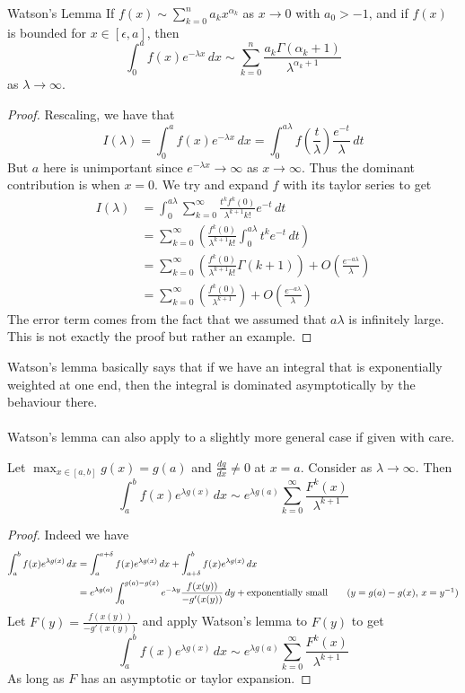 \documentclass[a4paper]{article}
\begin{document}
\begin{lmm}{Watson's Lemma}{} If $f(x)\sim\sum_{k=0}^na_kx^{\alpha_k}$ as $x\to 0$ with $a_0>-1$, and if $f(x)$ is bounded for $x\in[\epsilon,a]$, then $$\int_0^af(x)e^{-\lambda x}\,dx\sim\sum_{k=0}^n\frac{a_k\Gamma(\alpha_k+1)}{\lambda^{\alpha_k+1}}$$ as $\lambda\to\infty$. \tcbline
\begin{proof}
Rescaling, we have that $$I(\lambda)=\int_0^af(x)e^{-\lambda x}\,dx=\int_0^{a\lambda}f\left(\frac{t}{\lambda}\right)\frac{e^{-t}}{\lambda}\,dt$$ But $a$ here is unimportant since $e^{-\lambda x}\to\infty$ as $x\to\infty$. Thus the dominant contribution is when $x=0$. We try and expand $f$ with its taylor series to get 
\begin{align*}
I(\lambda)&=\int_0^{a\lambda}\sum_{k=0}^\infty\frac{t^kf^k(0)}{\lambda^{k+1}k!}e^{-t}\,dt\\
&=\sum_{k=0}^\infty\left(\frac{f^k(0)}{\lambda^{k+1}k!}\int_0^{a\lambda}t^ke^{-t}\,dt\right)\\
&=\sum_{k=0}^\infty\left(\frac{f^k(0)}{\lambda^{k+1}k!}\Gamma(k+1)\right)+O\left(\frac{e^{-a\lambda}}{\lambda}\right)\\
&=\sum_{k=0}^\infty\left(\frac{f^k(0)}{\lambda^{k+1}}\right)+O\left(\frac{e^{-a\lambda}}{\lambda}\right)
\end{align*}
The error term comes from the fact that we assumed that $a\lambda$ is infinitely large. This is not exactly the proof but rather an example. 
\end{proof}
\end{lmm}

Watson's lemma basically says that if we have an integral that is exponentially weighted at one end, then the integral is dominated asymptotically by the behaviour there. \\~\\
Watson's lemma can also apply to a slightly more general case if given with care. 
\begin{crl}{}{} Let $\max_{x\in[a,b]}g(x)=g(a)$ and $\frac{dg}{dx}\neq 0$ at $x=a$. Consider as $\lambda\to\infty$. Then $$\int_a^bf(x)e^{\lambda g(x)}\,dx\sim e^{\lambda g(a)}\sum_{k=0}^\infty\frac{F^k(x)}{\lambda^{k+1}}$$ \tcbline
\begin{proof}
Indeed we have 
\begin{align*}
\int_a^bf(x)e^{\lambda g(x)}\,dx&=\int_a^{a+\delta}f(x)e^{\lambda g(x)}\,dx+\int_{a+\delta}^bf(x)e^{\lambda g(x)}\,dx\\
&=e^{\lambda g(a)}\int_0^{g(a)-g(x)}e^{-\lambda y}\frac{f(x(y))}{-g'(x(y))}\,dy+\text{exponentially small}\tag{$y=g(a)-g(x)$, $x=y^{-1}$}
\end{align*}
Let $F(y)=\frac{f(x(y))}{-g'(x(y))}$ and apply Watson's lemma to $F(y)$ to get $$\int_a^bf(x)e^{\lambda g(x)}\,dx\sim e^{\lambda g(a)}\sum_{k=0}^\infty\frac{F^k(x)}{\lambda^{k+1}}$$
As long as $F$ has an asymptotic or taylor expansion. 
\end{proof}
\end{crl}
\end{document}
